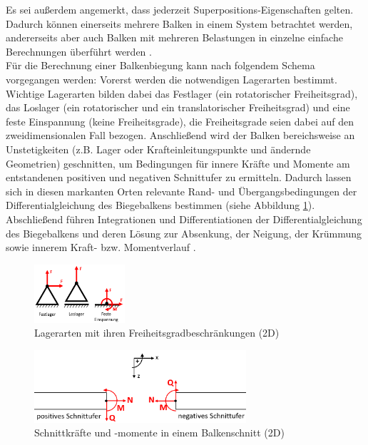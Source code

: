 \noindent Es sei außerdem angemerkt, dass jederzeit Superpositions-Eigenschaften gelten. Dadurch können einerseits mehrere Balken in einem System betrachtet werden, andererseits aber auch Balken mit mehreren Belastungen in einzelne einfache Berechnungen überführt werden \cite{item16}.\\

\noindent Für die Berechnung einer Balkenbiegung kann nach folgendem Schema vorgegangen werden: Vorerst werden die notwendigen Lagerarten bestimmt. Wichtige Lagerarten bilden dabei das Festlager (ein rotatorischer Freiheitsgrad), das Loslager (ein rotatorischer und ein translatorischer Freiheitsgrad) und eine feste Einspannung (keine Freiheitsgrade), die Freiheitsgrade seien dabei auf den zweidimensionalen Fall bezogen. Anschließend wird der Balken bereichsweise an  Unstetigkeiten (z.B. Lager oder Krafteinleitungspunkte und ändernde Geometrien) geschnitten, um Bedingungen für innere Kräfte und Momente am entstandenen positiven und negativen Schnittufer zu ermitteln. Dadurch lassen sich in diesen markanten Orten relevante Rand- und Übergangsbedingungen der Differentialgleichung des Biegebalkens bestimmen (siehe Abbildung \ref{fig: Lager}). Abschließend führen Integrationen und Differentiationen der Differentialgleichung des Biegebalkens und deren Lösung  zur Absenkung, der Neigung, der Krümmung sowie innerem Kraft- bzw. Momentverlauf \cite{item16}\cite{item9}.
\begin{figure}[h]
	\centering
	\label{fig: Lager}
	\includegraphics[width=0.3\textwidth]{Bilder/Einspannungen.png}
	\caption{Lagerarten mit ihren Freiheitsgradbeschränkungen (2D)}
\end{figure}
\begin{figure}[h]
	\centering
	\label{fig: Schnitt}
	\includegraphics[width=0.7\textwidth]{Bilder/Schnittufer.png}
	\caption{Schnittkräfte und -momente in einem Balkenschnitt (2D)}
\end{figure}

